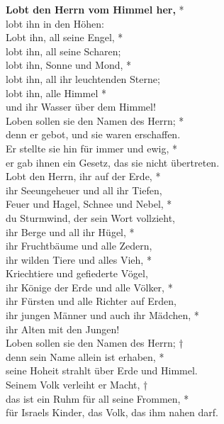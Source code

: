 \vspace{0.6cm}

\def\greinitialformat#1{{\fontsize{40}{40}\selectfont #1}}
\gresetfirstlineaboveinitial{\small \textcolor{red}{Ps 148}}{}
\setaboveinitialseparation{0.72mm}


\vspace{0.6cm}

{\bf{Lobt den Herrn vom Himmel her,}} *\\ \vin lobt ihn in den Höhen:\\
Lobt ihn, all seine Engel, *\\ lobt ihn, all seine Scharen;\\
\vin lobt ihn, Sonne und Mond, *\\ \vin lobt ihn, all ihr leuchtenden Sterne;\\
lobt ihn, alle Himmel *\\ und ihr Wasser über dem Himmel!\\
\vin Loben sollen sie den Namen des Herrn; *\\ \vin denn er gebot, und sie waren erschaffen.\\
Er stellte sie hin für immer und ewig, *\\ er gab ihnen ein Gesetz, das sie nicht übertreten.\\
\vin Lobt den Herrn, ihr auf der Erde, *\\ \vin ihr Seeungeheuer und all ihr Tiefen,\\
Feuer und Hagel, Schnee und Nebel, *\\ du Sturmwind, der sein Wort vollzieht,\\
\vin ihr Berge und all ihr Hügel, *\\ \vin ihr Fruchtbäume und alle Zedern,\\
ihr wilden Tiere und alles Vieh, *\\ Kriechtiere und gefiederte Vögel,\\
\vin ihr Könige der Erde und alle Völker, *\\ \vin ihr Fürsten und alle Richter auf Erden,\\
ihr jungen Männer und auch ihr Mädchen, *\\ ihr Alten mit den Jungen!\\
\vin Loben sollen sie den Namen des Herrn; †\\ \vin denn sein Name allein ist erhaben, *\\ \vin seine Hoheit strahlt über Erde und Himmel.\\
Seinem Volk verleiht er Macht, †\\ das ist ein Ruhm für all seine Frommen, *\\ für Israels Kinder, das Volk, das ihm nahen darf. \\


